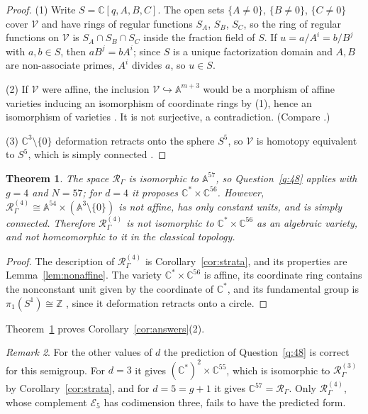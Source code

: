 \documentclass{amsart}
\newtheorem{theorem}{Theorem}[section]
\theoremstyle{definition}
\theoremstyle{remark}
\newtheorem{remark}[theorem]{Remark}
\numberwithin{equation}{section}
\newcommand{\CC}{\mathbb{C}}
\newcommand{\ZZ}{\mathbb{Z}}
\newcommand{\AF}{\mathbb{A}}
\newcommand{\Rs}{\mathcal{R}_\Gamma}
\newcommand{\Rd}[1]{\mathcal{R}^{(#1)}_\Gamma}
\newcommand{\Ed}[1]{\mathcal{E}_{#1}}
\begin{document}
\begin{proof}
(1) Write $S=\CC[q,A,B,C]$. The open sets $\{A\ne0\}$, $\{B\ne0\}$, $\{C\ne0\}$ cover $\mathcal V$ and have rings of regular functions $S_A$, $S_B$, $S_C$, so the ring of regular functions on $\mathcal V$ is $S_A\cap S_B\cap S_C$ inside the fraction field of $S$. If $u=a/A^i=b/B^j$ with $a,b\in S$, then $aB^j=bA^i$; since $S$ is a unique factorization domain and $A,B$ are non-associate primes, $A^i$ divides $a$, so $u\in S$.

(2) If $\mathcal V$ were affine, the inclusion $\mathcal V\hookrightarrow\AF^{m+3}$ would be a morphism of affine varieties inducing an isomorphism of coordinate rings by (1), hence an isomorphism of varieties \cite[Corollary~I.3.7]{Har77}. It is not surjective, a contradiction. (Compare \cite[Exercise~I.3.6]{Har77}.)

(3) $\CC^3\setminus\{0\}$ deformation retracts onto the sphere $S^5$, so $\mathcal V$ is homotopy equivalent to $S^5$, which is simply connected \cite[Proposition~1.14]{Hat02}.
\end{proof}

\begin{theorem}\label{thm:q48}
The space $\Rs$ is isomorphic to $\AF^{57}$, so Question~\ref{q:48} applies with $g=4$ and $N=57$; for $d=4$ it proposes $\CC^*\times\CC^{56}$. However, $\Rd{4}\cong\AF^{54}\times(\AF^3\setminus\{0\})$ is not affine, has only constant units, and is simply connected. Therefore $\Rd{4}$ is not isomorphic to $\CC^*\times\CC^{56}$ as an algebraic variety, and not homeomorphic to it in the classical topology.
\end{theorem}

\begin{proof}
The description of $\Rd{4}$ is Corollary~\ref{cor:strata}, and its properties are Lemma~\ref{lem:nonaffine}. The variety $\CC^*\times\CC^{56}$ is affine, its coordinate ring contains the nonconstant unit given by the coordinate of $\CC^*$, and its fundamental group is $\pi_1(S^1)\cong\ZZ$ \cite[Theorem~1.7]{Hat02}, since it deformation retracts onto a circle.
\end{proof}

Theorem~\ref{thm:q48} proves Corollary~\ref{cor:answers}(2).

\begin{remark}
For the other values of $d$ the prediction of Question~\ref{q:48} is correct for this semigroup. For $d=3$ it gives $(\CC^*)^2\times\CC^{55}$, which is isomorphic to $\Rd{3}$ by Corollary~\ref{cor:strata}, and for $d=5=g+1$ it gives $\CC^{57}=\Rs$. Only $\Rd{4}$, whose complement $\Ed{5}$ has codimension three, fails to have the predicted form.
\end{remark}
\end{document}
